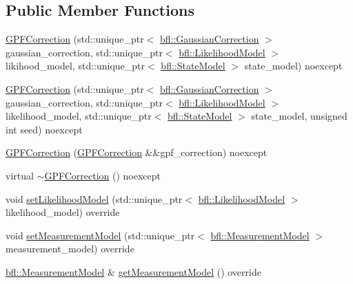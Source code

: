 \subsection*{Public Member Functions}
\begin{DoxyCompactItemize}
\item 
\mbox{\hyperlink{classbfl_1_1GPFCorrection_aa3dbc7bc8252895a11fcf547beb231ed}{G\+P\+F\+Correction}} (std\+::unique\+\_\+ptr$<$ \mbox{\hyperlink{classbfl_1_1GaussianCorrection}{bfl\+::\+Gaussian\+Correction}} $>$ gaussian\+\_\+correction, std\+::unique\+\_\+ptr$<$ \mbox{\hyperlink{classbfl_1_1LikelihoodModel}{bfl\+::\+Likelihood\+Model}} $>$ likihood\+\_\+model, std\+::unique\+\_\+ptr$<$ \mbox{\hyperlink{classbfl_1_1StateModel}{bfl\+::\+State\+Model}} $>$ state\+\_\+model) noexcept
\item 
\mbox{\hyperlink{classbfl_1_1GPFCorrection_a92bf53cc6b5890e0f415de3b8f6f0d18}{G\+P\+F\+Correction}} (std\+::unique\+\_\+ptr$<$ \mbox{\hyperlink{classbfl_1_1GaussianCorrection}{bfl\+::\+Gaussian\+Correction}} $>$ gaussian\+\_\+correction, std\+::unique\+\_\+ptr$<$ \mbox{\hyperlink{classbfl_1_1LikelihoodModel}{bfl\+::\+Likelihood\+Model}} $>$ likelihood\+\_\+model, std\+::unique\+\_\+ptr$<$ \mbox{\hyperlink{classbfl_1_1StateModel}{bfl\+::\+State\+Model}} $>$ state\+\_\+model, unsigned int seed) noexcept
\item 
\mbox{\hyperlink{classbfl_1_1GPFCorrection_a7de055f5b25ffe93ab4ff4ca0a6729ee}{G\+P\+F\+Correction}} (\mbox{\hyperlink{classbfl_1_1GPFCorrection}{G\+P\+F\+Correction}} \&\&gpf\+\_\+correction) noexcept
\item 
virtual \mbox{\hyperlink{classbfl_1_1GPFCorrection_abaf42b1e27993b612800d96268a919c9}{$\sim$\+G\+P\+F\+Correction}} () noexcept
\item 
void \mbox{\hyperlink{classbfl_1_1GPFCorrection_a93104fdc7a1bccc4c7350fbd7bd46997}{set\+Likelihood\+Model}} (std\+::unique\+\_\+ptr$<$ \mbox{\hyperlink{classbfl_1_1LikelihoodModel}{bfl\+::\+Likelihood\+Model}} $>$ likelihood\+\_\+model) override
\item 
void \mbox{\hyperlink{classbfl_1_1GPFCorrection_a08ee265b0aed304403a64ef3132ba50a}{set\+Measurement\+Model}} (std\+::unique\+\_\+ptr$<$ \mbox{\hyperlink{classbfl_1_1MeasurementModel}{bfl\+::\+Measurement\+Model}} $>$ measurement\+\_\+model) override
\item 
\mbox{\hyperlink{classbfl_1_1MeasurementModel}{bfl\+::\+Measurement\+Model}} \& \mbox{\hyperlink{classbfl_1_1GPFCorrection_a670298795b61fab434eefd192b7fe81f}{get\+Measurement\+Model}} () override

\end{DoxyCompactItemize}
